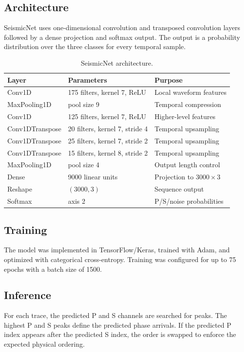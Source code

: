 \documentclass[11pt]{article}
\begin{document}
\subsection{Architecture}
SeismicNet uses one-dimensional convolution and transposed convolution layers followed by a dense projection and softmax output. The output is a probability distribution over the three classes for every temporal sample.

\begin{table}[h]
\centering
\caption{SeismicNet architecture.}
\begin{tabular}{lll}
\toprule
Layer & Parameters & Purpose \\
\midrule
Conv1D & 175 filters, kernel 7, ReLU & Local waveform features \\
MaxPooling1D & pool size 9 & Temporal compression \\
Conv1D & 125 filters, kernel 7, ReLU & Higher-level features \\
Conv1DTranspose & 20 filters, kernel 7, stride 4 & Temporal upsampling \\
Conv1DTranspose & 25 filters, kernel 7, stride 2 & Temporal upsampling \\
Conv1DTranspose & 15 filters, kernel 8, stride 2 & Temporal upsampling \\
MaxPooling1D & pool size 4 & Output length control \\
Dense & 9000 linear units & Projection to $3000\times3$ \\
Reshape & $(3000,3)$ & Sequence output \\
Softmax & axis 2 & P/S/noise probabilities \\
\bottomrule
\end{tabular}
\end{table}

\subsection{Training}
The model was implemented in TensorFlow/Keras, trained with Adam, and optimized with categorical cross-entropy. Training was configured for up to 75 epochs with a batch size of 1500.

\subsection{Inference}
For each trace, the predicted P and S channels are searched for peaks. The highest P and S peaks define the predicted phase arrivals. If the predicted P index appears after the predicted S index, the order is swapped to enforce the expected physical ordering.
\end{document}
